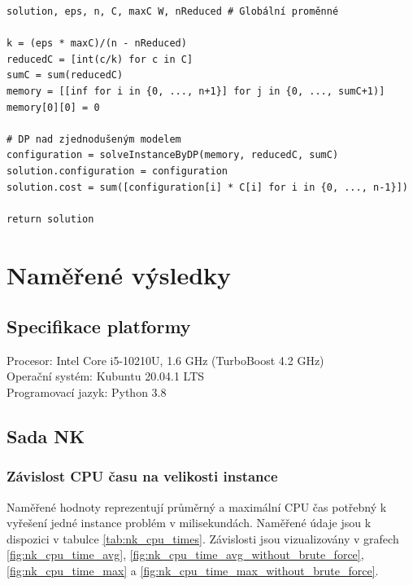 \documentclass[12pt]{article}
\begin{document}
\begin{listing}[ht]
    \begin{verbatim}
solution, eps, n, C, maxC W, nReduced # Globální proměnné

k = (eps * maxC)/(n - nReduced)
reducedC = [int(c/k) for c in C]
sumC = sum(reducedC)
memory = [[inf for i in {0, ..., n+1}] for j in {0, ..., sumC+1)]
memory[0][0] = 0

# DP nad zjednodušeným modelem
configuration = solveInstanceByDP(memory, reducedC, sumC)
solution.configuration = configuration
solution.cost = sum([configuration[i] * C[i] for i in {0, ..., n-1}])

return solution

    \end{verbatim}
\end{listing}

\newpage

\section{Naměřené výsledky}

\subsection{Specifikace platformy}

Procesor: Intel Core i5-10210U, 1.6 GHz (TurboBoost 4.2 GHz) \\
Operační systém: Kubuntu 20.04.1 LTS \\
Programovací jazyk: Python 3.8

\subsection{Sada NK}

\subsubsection{Závislost CPU času na velikosti instance}

Naměřené hodnoty reprezentují průměrný a maximální CPU čas potřebný k vyřešení jedné instance problém v milisekundách. Naměřené údaje jsou k dispozici v tabulce \ref{tab:nk_cpu_times}. Závislosti jsou vizualizovány v grafech \ref{fig:nk_cpu_time_avg}, \ref{fig:nk_cpu_time_avg_without_brute_force}, \ref{fig:nk_cpu_time_max} a \ref{fig:nk_cpu_time_max_without_brute_force}.
\end{document}
